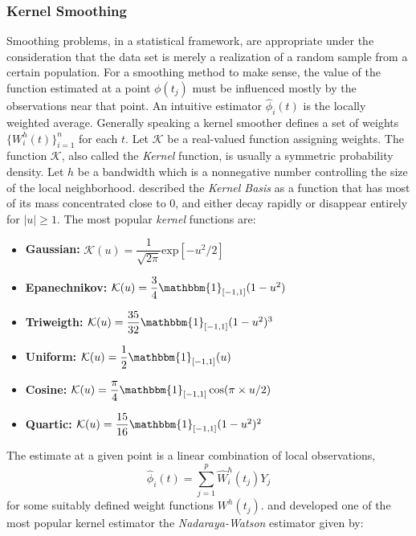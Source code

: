 \subsubsection*{Kernel Smoothing}
Smoothing problems, in a statistical framework, are appropriate under the consideration that the data set is merely a realization of a random sample from a certain population. For a smoothing method to make sense, the value of the function estimated at a point $\phi(t_{j})$ must be influenced mostly by the observations near that point. An intuitive estimator $\hat{\phi}_{i}(t)$ is the locally weighted average. Generally speaking a kernel smoother defines a set of weights $\{W_{i}^{h}(t)\}^{n}_{i=1}$ for each $t$.
Let $\mathcal{K}$ be a real-valued function assigning weights. The function $\mathcal{K}$, also called the \textit{Kernel} function, is usually a symmetric probability density. Let $h$ be a bandwidth which is a nonnegative number controlling the size of the local neighborhood. \cite{olberd:ramsay} described the \textit{Kernel Basis} as a function that has most of its mass concentrated close to 0, and either decay rapidly or disappear entirely for $|u| \geq 1$. The most popular \textit{kernel} functions are:
\begin{itemize}
\item \textbf{Gaussian:} $\mathcal{K}(u)=\dfrac{1}{\sqrt{2\pi}}\text{exp}\left[-u^{2}/2\right]$
\item \textbf{Epanechnikov:} $\mathcal{K}(u)= \dfrac{3}{4} \mathbbm{1}_{\left[-1,1\right]}(1-u^{2})$
\item \textbf{Triweigth:} $\mathcal{K}(u)= \dfrac{35}{32} \mathbbm{1}_{\left[-1,1\right]}(1-u^{2})^{3}$
\item \textbf{Uniform:} $\mathcal{K}(u)= \dfrac{1}{2} \mathbbm{1}_{\left[-1,1\right]}(u)$
\item \textbf{Cosine:} $\mathcal{K}(u)= \dfrac{\pi}{4} \mathbbm{1}_{\left[-1,1\right]}\cos(\pi \times u/2)$
\item \textbf{Quartic:} $\mathcal{K}(u)=\dfrac{15}{16} \mathbbm{1}_{\left[-1,1\right]}(1-u^{2})^{2}$ 
\end{itemize}
The estimate at a given point is a linear combination of local observations,
\begin{equation*}
\hat{\phi}_{i}(t) = \sum\limits_{j=1}^{p}\hat{W}_{i}^{h}(t_{j})Y_{j}
\end{equation*}
for some suitably defined weight functions $W^{h}(t_{j})$. \citet{Nada1964} and \citet{Wats1964} developed one of the most popular kernel estimator the \textit{Nadaraya-Watson} estimator given by:
